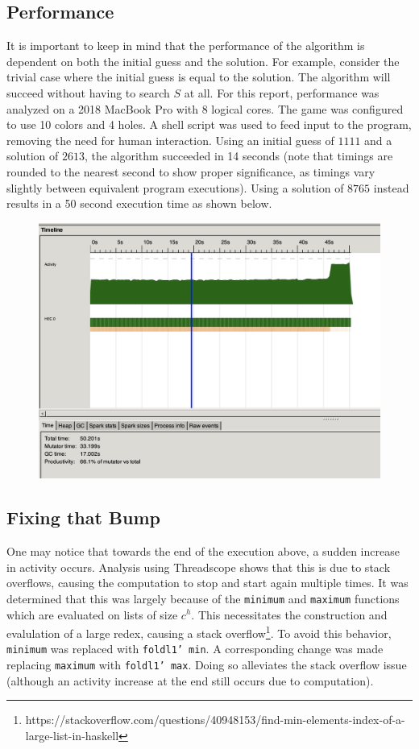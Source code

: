 \documentclass{article}
\begin{document}
\subsection{Performance}
It is important to keep in mind that the performance of the algorithm is dependent on both the initial guess and the solution. For example, consider the trivial case where the initial guess is equal to the solution. The algorithm will succeed without having to search $S$ at all. For this report, performance was analyzed on a 2018 MacBook Pro with 8 logical cores. The game was configured to use 10 colors and 
4 holes. A shell script was used to feed input to the program, removing the need for human interaction. Using an initial guess of $1111$ and a solution of $2613$, the algorithm succeeded in 14 seconds (note that timings are rounded to the nearest second to show proper significance, as timings vary slightly between equivalent program executions). Using a solution of $8765$ 
instead results in a 50 second execution time as shown below.
\begin{figure}[H]
	\centering
	\includegraphics[width=35em]{../images/before_pl.png}
\end{figure}



\subsection{Fixing that Bump}
One may notice that towards the end of the execution above, a sudden increase in activity occurs. Analysis using Threadscope shows that this is due to stack overflows, causing the computation to stop and start again multiple times. It was determined that this was largely because of the \texttt{minimum} and \texttt{maximum} functions which are evaluated on lists of size $c^h$. This necessitates the construction and evalulation of a large redex, causing a stack overflow\footnote{https://stackoverflow.com/questions/40948153/find-min-elements-index-of-a-large-list-in-haskell}. To avoid this behavior, \texttt{minimum} was replaced with \texttt{foldl1' min}. A corresponding change was made replacing \texttt{maximum} with \texttt{foldl1' max}. Doing so alleviates the stack overflow issue (although an activity increase at the end still occurs due to computation).
\end{document}
